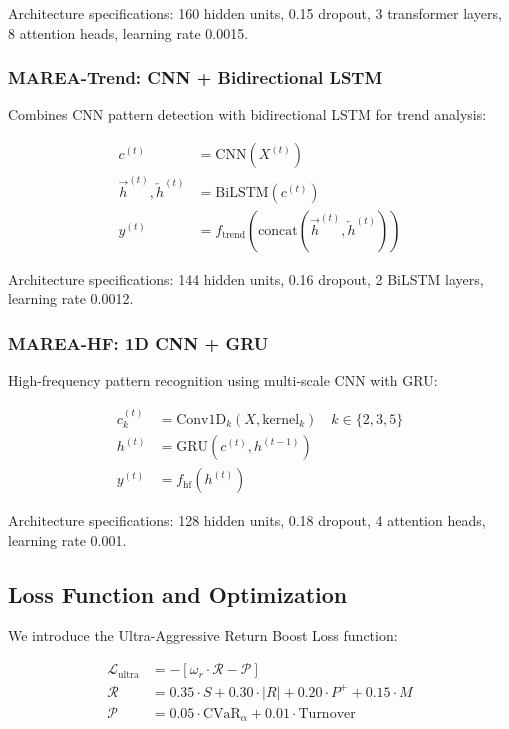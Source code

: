 \documentclass[10pt,twocolumn]{article}
\begin{document}
Architecture specifications: 160 hidden units, 0.15 dropout, 3 transformer layers, 8 attention heads, learning rate 0.0015.

\subsubsection{MAREA-Trend: CNN + Bidirectional LSTM}

Combines CNN pattern detection with bidirectional LSTM for trend analysis:

\begin{align}
c^{(t)} &= \text{CNN}(X^{(t)}) \\
\vec{h}^{(t)}, \overleftarrow{h}^{(t)} &= \text{BiLSTM}(c^{(t)}) \\
y^{(t)} &= f_{\text{trend}}(\text{concat}(\vec{h}^{(t)}, \overleftarrow{h}^{(t)}))
\end{align}

Architecture specifications: 144 hidden units, 0.16 dropout, 2 BiLSTM layers, learning rate 0.0012.

\subsubsection{MAREA-HF: 1D CNN + GRU}

High-frequency pattern recognition using multi-scale CNN with GRU:

\begin{align}
c_k^{(t)} &= \text{Conv1D}_k(X, \text{kernel}_k) \quad k \in \{2,3,5\} \\
h^{(t)} &= \text{GRU}(c^{(t)}, h^{(t-1)}) \\
y^{(t)} &= f_{\text{hf}}(h^{(t)})
\end{align}

Architecture specifications: 128 hidden units, 0.18 dropout, 4 attention heads, learning rate 0.001.

\subsection{Loss Function and Optimization}

We introduce the Ultra-Aggressive Return Boost Loss function:

\begin{align}
\mathcal{L}_{\text{ultra}} &= -\left[\omega_r \cdot \mathcal{R} - \mathcal{P}\right] \\
\mathcal{R} &= 0.35 \cdot S + 0.30 \cdot |R| + 0.20 \cdot P^+ + 0.15 \cdot M \\
\mathcal{P} &= 0.05 \cdot \text{CVaR}_{\alpha} + 0.01 \cdot \text{Turnover}
\end{align}
\end{document}
